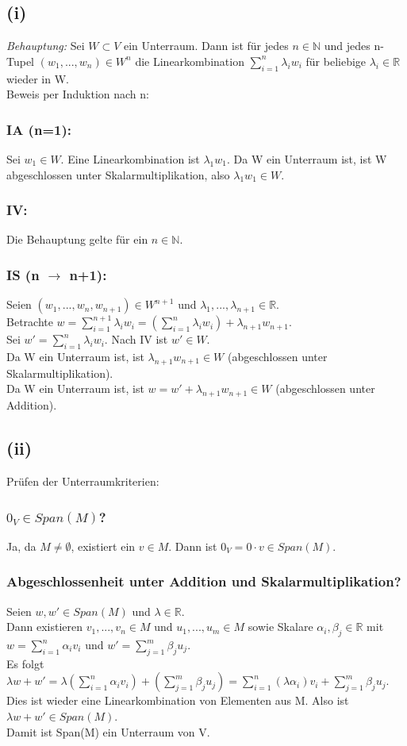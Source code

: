 \documentclass{article}
\begin{document}
\subsection*{(i)}
\textit{Behauptung:} Sei $W \subset V$ ein Unterraum. Dann ist für jedes $n \in \mathbb{N}$ und jedes n-Tupel $(w_1, ..., w_n) \in W^n$ die Linearkombination $\sum_{i=1}^n \lambda_i w_i$ für beliebige $\lambda_i \in \mathbb{R}$ wieder in W. \\
Beweis per Induktion nach n: 
\subsubsection*{IA (n=1):} Sei $w_1 \in W$. Eine Linearkombination ist $\lambda_1 w_1$. Da W ein Unterraum ist, ist W abgeschlossen unter Skalarmultiplikation, also $\lambda_1 w_1 \in W$. 
\subsubsection*{IV:} Die Behauptung gelte für ein $n \in \mathbb{N}$. 
\subsubsection*{IS (n $\to$ n+1):} Seien $(w_1, ..., w_n, w_{n+1}) \in W^{n+1}$ und $\lambda_1, ..., \lambda_{n+1} \in \mathbb{R}$. \\ Betrachte $w = \sum_{i=1}^{n+1} \lambda_i w_i = (\sum_{i=1}^n \lambda_i w_i) + \lambda_{n+1} w_{n+1}$. \\
Sei $w' = \sum_{i=1}^n \lambda_i w_i$. Nach IV ist $w' \in W$. \\
Da W ein Unterraum ist, ist $\lambda_{n+1} w_{n+1} \in W$ (abgeschlossen unter Skalarmultiplikation). \\
Da W ein Unterraum ist, ist $w = w' + \lambda_{n+1} w_{n+1} \in W$ (abgeschlossen unter Addition).
    

\subsection*{(ii)}
Prüfen der Unterraumkriterien:
\subsubsection*{$0_V \in Span(M)$?}
Ja, da $M \ne \emptyset$, existiert ein $v \in M$. Dann ist $0_V = 0 \cdot v \in Span(M)$.
\subsubsection*{Abgeschlossenheit unter Addition und Skalarmultiplikation?}
Seien $w, w' \in Span(M)$ und $\lambda \in \mathbb{R}$.\\ 
Dann existieren $v_1, ..., v_n \in M$ und $u_1, ..., u_m \in M$ sowie Skalare $\alpha_i, \beta_j \in \mathbb{R}$ mit $w = \sum_{i=1}^n \alpha_i v_i$ und $w' = \sum_{j=1}^m \beta_j u_j$.\\
Es folgt $\lambda w + w' = \lambda (\sum_{i=1}^n \alpha_i v_i) + (\sum_{j=1}^m \beta_j u_j) = \sum_{i=1}^n (\lambda \alpha_i) v_i + \sum_{j=1}^m \beta_j u_j$. \\
Dies ist wieder eine Linearkombination von Elementen aus M. Also ist $\lambda w + w' \in Span(M)$. \\
Damit ist Span(M) ein Unterraum von V. 
\end{document}
